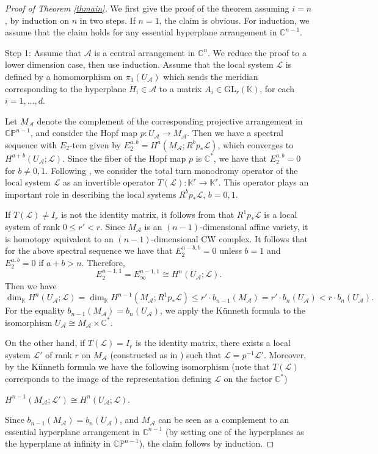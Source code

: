 \documentclass[12pt,leqno,twoside]{amsart}
\theoremstyle{plain}
\theoremstyle{definition}
\newcommand{\C}{\mathbb{C}}
\newcommand{\K}{\mathbb{K}}
\newcommand{\sA}{\mathcal{A}}
\newcommand{\sL}{\mathcal{L}}
\begin{document}
\begin{proof}[Proof of Theorem \ref{thmain}]
 We first give the proof of the theorem assuming $i=n$, by induction on $n$ in two steps.  If $n=1$, the claim is obvious. For induction, we assume that the claim holds for any essential hyperplane arrangement in $\C^{n-1}$.

\medskip

\noindent Step 1:   Assume that $\sA$ is a central arrangement in $\C^n$. We reduce the proof  to a lower dimension case, then use induction. Assume that the local system $\sL$ is defined by a homomorphism on $\pi_1(U_\sA)$ which sends the meridian corresponding to the hyperplane $H_i\in \sA$  to a matrix $A_i \in \mathrm{GL}_r(\K)$, for each $i=1,\ldots,d$. 

Let $M_\sA$ denote the  complement of the
corresponding projective arrangement in $\mathbb{CP}^{n -1}$, and consider the Hopf map $p\colon U_\sA \to M_\sA$. 
Then we have a spectral sequence 
with $E_2$-tem given by $E_2^{a,b}= H^a(M_\sA; R^b p_* \sL)$, which converges to $H^{a+b}(U_\sA;\sL)$. Since the fiber of the Hopf map $p$ is $\C^*$, we have that $E_2^{a,b}=0$ for $b\neq 0,1$. 
Following \cite[page 210]{Dim04}, we consider the total turn monodromy operator of the local system $\sL$ as an  invertible operator $T(\sL):\K^r \to \K^r$. This operator plays an important role in describing the local systems $R^b p_* \sL$, $b=0,1$.

If $T(\sL)\neq I_r$ is not the identity matrix, it follows from \cite[Proposition 6.4.3]{Dim04} that 
$R^1 p_* \sL$ is a local system of rank $0\leq r'<r$. 
Since $ M_\sA$ is an $(n-1)$-dimensional affine variety, it is homotopy equivalent to an $(n-1)$-dimensional CW complex. It follows that for the above spectral sequence we have that $E_2^{n-b,b}=0 $ unless $b=1$ and $E_2^{a,b}=0$ if $a+b>n$. Therefore,  
 $$E_2^{n-1,1}= E_\infty^{n-1,1}\cong H^n(U_\sA;\sL) .$$
Then we have $$\dim_\K H^n(U_\sA;\sL) = \dim_\K H^{n-1}(M_\sA; R^1 p_* \sL)\leq r'\cdot b_{n-1}(M_\sA)=r'\cdot b_{n}(U_\sA)<r\cdot b_{n}(U_\sA).$$  For the equality $b_{n-1}(M_\sA)=b_{n}(U_\sA)$, we apply the K\"unneth formula to the isomorphism $U_\sA\cong M_\sA \times \C^*$.


On the other hand,  
if $T(\sL)= I_r$ is the identity matrix, 
there exists a local system $\sL'$ of rank $r$ on $M_\sA$ (constructed as in \cite[Proposition 6.4.3]{Dim04}) such that $\sL=p^{-1} \sL'$. Moreover, by the K\"unneth formula we have the following isomorphism (note that $T(\sL)$ corresponds to the image of the representation defining $\sL$ on the factor $\C^*$)
\begin{center}
    $  H^{n-1}(M_\sA;\sL')\cong  H^{n}(U_\sA;\sL) $.
    \end{center}
Since $b_{n-1}(M_\sA)= b_{n}(U_\sA)$, and $M_\sA$ can be seen as a complement 
to an essential hyperplane arrangement in $\C^{n-1}$ (by setting one of the hyperplanes as the hyperplane at infinity in $\mathbb{CP}^{n -1}$),  the claim follows  by induction. 



\end{proof}
\end{document}
